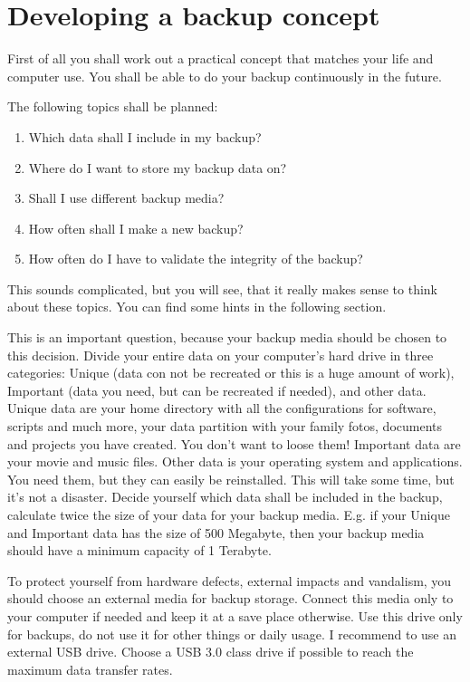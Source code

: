 \section{Developing a backup concept}
First of all you shall work out a practical concept that matches your life and
computer use. You shall be able to do your backup continuously in the future.

The following topics shall be planned:
\begin{enumerate}
\item Which data shall I include in my backup?
\item Where do I want to store my backup data on?
\item Shall I use different backup media?
\item How often shall I make a new backup?
\item How often do I have to validate the integrity of the backup?
\end{enumerate}

This sounds complicated, but you will see, that it really makes sense to think about
these topics. You can find some hints in the following section.

This is an important question, because your backup media should be chosen to this
decision. Divide your entire data on your computer's hard drive in three categories:
Unique (data con not be recreated or this is a huge amount of work), Important (data
you need, but can be recreated if needed), and other data.
Unique data are your home directory with all the configurations for software, scripts
and much more, your data partition with your family fotos, documents and projects you
have created. You don't want to loose them!
Important data are your movie and music files.
Other data is your operating system and applications. You need them, but they can easily
be reinstalled. This will take some time, but it's not a disaster.
Decide yourself which data shall be included in the backup, calculate twice the
size of your data for your backup media. E.g. if your Unique and Important data has the
size of 500 Megabyte, then your backup media should have a minimum capacity of 1 Terabyte.

To protect yourself from hardware defects, external impacts and vandalism, you should
choose an external media for backup storage. Connect this media only to your computer
if needed and keep it at a save place otherwise. Use this drive only for backups,
do not use it for other things or daily usage. I recommend to use an external USB
drive. Choose a USB 3.0 class drive if possible to reach the maximum data transfer rates.

